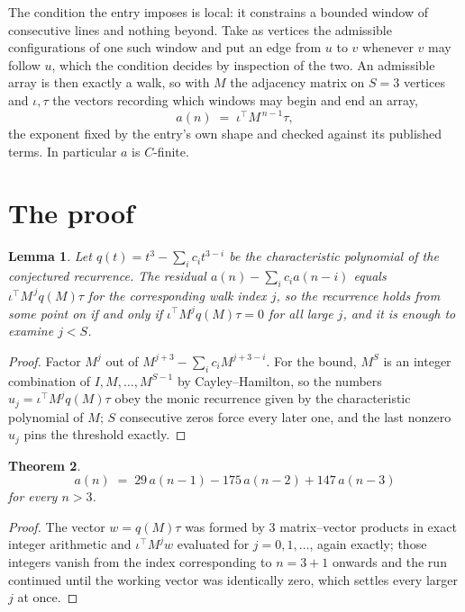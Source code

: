 \documentclass[11pt,a4paper]{article}
\theoremstyle{plain}
\newtheorem{theorem}{Theorem}
\newtheorem{lemma}[theorem]{Lemma}
\theoremstyle{definition}
\begin{document}
The condition the entry imposes is local: it constrains a bounded window of consecutive lines and nothing beyond. Take as
vertices the admissible configurations of one such window and put an edge from $u$ to $v$
whenever $v$ may follow $u$, which the condition decides by inspection of the two. An
admissible array is then exactly a walk, so with $M$ the adjacency matrix on $S=3$ vertices
and $\iota,\tau$ the vectors recording which windows may begin and end an array,
\[
a(n)\;=\;\iota^{\!\top}M^{\,n-1}\tau ,
\]
the exponent fixed by the entry's own shape and checked against its published terms. In
particular $a$ is $C$-finite.

\section{The proof}

\begin{lemma}\label{lem:crit}
Let $q(t)=t^{3}-\sum_i c_it^{3-i}$ be the characteristic polynomial of the
conjectured recurrence. The residual $a(n)-\sum_ic_ia(n-i)$ equals
$\iota^{\!\top}M^{\,j}q(M)\tau$ for the corresponding walk index $j$, so the recurrence
holds from some point on if and only if $\iota^{\!\top}M^{j}q(M)\tau=0$ for all large $j$,
and it is enough to examine $j<S$.
\end{lemma}

\begin{proof}
Factor $M^{j}$ out of $M^{j+3}-\sum_ic_iM^{j+3-i}$. For the bound, $M^{S}$
is an integer combination of $I,M,\dots,M^{S-1}$ by Cayley--Hamilton, so the numbers
$u_j=\iota^{\!\top}M^{j}q(M)\tau$ obey the monic recurrence given by the characteristic
polynomial of $M$; $S$ consecutive zeros force every later one, and the last nonzero $u_j$
pins the threshold exactly.
\end{proof}

\begin{theorem}
\[
a(n)\;=\;29\,a(n-1) - 175\,a(n-2) + 147\,a(n-3)
\]
for every $n>3$.
\end{theorem}

\begin{proof}
The vector $w=q(M)\tau$ was formed by $3$ matrix--vector products in exact integer
arithmetic and $\iota^{\!\top}M^{j}w$ evaluated for $j=0,1,\dots$, again exactly; those
integers vanish from the index corresponding to $n=3+1$ onwards and the run continued
until the working vector was identically zero, which settles every larger $j$ at once.
\end{proof}
\end{document}

